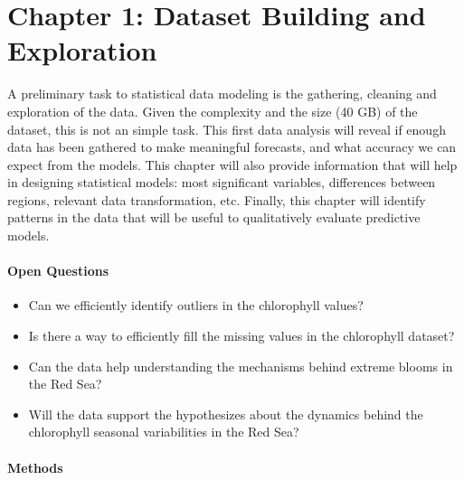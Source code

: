 \section{Chapter 1: Dataset Building and Exploration}

A preliminary task to statistical data modeling is the gathering, cleaning and
exploration of the data. Given the complexity and the size (40 GB) of the
dataset, this is not an simple task. This first data analysis will reveal if
enough data has been gathered to make meaningful forecasts, and what accuracy
we can expect from the models. This chapter will also provide information that
will help in designing statistical models: most significant variables,
differences between regions, relevant data transformation, etc. Finally, this
chapter will identify patterns in the data that will be useful to qualitatively
evaluate predictive models.

\paragraph{Open Questions}

\begin{itemize} 

\item Can we efficiently identify outliers in the chlorophyll values?

\item Is there a way to efficiently fill the missing values in the chlorophyll
dataset?

\item Can the data help understanding the mechanisms behind extreme blooms in
the Red Sea?

\item Will the data support the hypothesizes about the dynamics behind the
chlorophyll seasonal variabilities in the Red Sea?

\end{itemize}

\paragraph{Methods}

